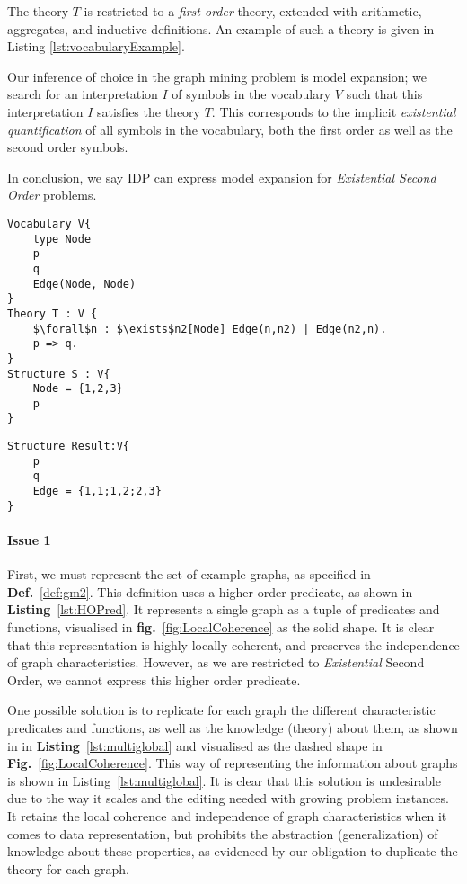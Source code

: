 \documentclass{article}
\theoremstyle{definition}
\begin{document}
The theory $T$ is restricted to a \emph{first order} theory, extended with arithmetic, aggregates, and inductive definitions.
An example of such a theory is given in Listing \ref{lst:vocabularyExample}.

Our inference of choice in the graph mining problem is model expansion; we search for an interpretation $I$ of symbols in the vocabulary $V$ such that this interpretation $I$ satisfies the theory $T$.
This corresponds to the implicit \emph{existential quantification} of all symbols in the vocabulary, both the first order as well as the second order symbols.

In conclusion, we say IDP can express model expansion for \emph{Existential Second Order} problems.

\begin{lstlisting}[mathescape,basicstyle=\fontfamily{lmvtt}\selectfont,caption=\ldots, label=lst:vocabularyExample]
Vocabulary V{
    type Node
    p
    q
    Edge(Node, Node)
}
Theory T : V {
    $\forall$n : $\exists$n2[Node] Edge(n,n2) | Edge(n2,n).
    p => q.
}
Structure S : V{
    Node = {1,2,3}
    p
}
\end{lstlisting}
\begin{lstlisting}
Structure Result:V{
    p
    q
    Edge = {1,1;1,2;2,3}
}
\end{lstlisting}


\paragraph{Issue 1}
First, we must represent the set of example graphs, as specified in \textbf{Def.}~\ref{def:gm2}. 
This definition uses a higher order predicate, as shown in \textbf{Listing}~\ref{lst:HOPred}. 
It represents a single graph as a tuple of predicates and functions, visualised in \textbf{fig.}~\ref{fig:LocalCoherence} as the solid shape.
It is clear that this representation is highly locally coherent, and preserves the independence of graph characteristics.
However, as we are restricted to \emph{Existential} Second Order, we cannot express this higher order predicate.

One possible solution is to replicate for each graph the different characteristic predicates and functions, as well as the knowledge (theory) about them, as shown in
in \textbf{Listing}~\ref{lst:multiglobal} and visualised as the dashed shape in \textbf{Fig.}~\ref{fig:LocalCoherence}.
This way of representing the information about graphs is shown in Listing~\ref{lst:multiglobal}.
It is clear that this solution is undesirable due to the way it scales and the editing needed with growing problem instances.
It retains the local coherence and independence of graph characteristics when it comes to data representation, but prohibits the abstraction (generalization) of knowledge about these properties, as evidenced by our obligation to duplicate the theory for each graph.
\end{document}

